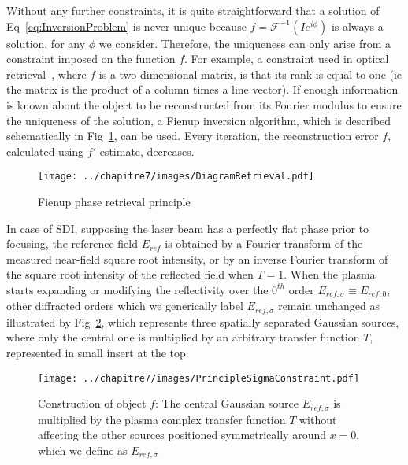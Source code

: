Without any further constraints, it is quite straightforward that a solution of Eq~\ref{eq:InversionProblem} is never unique because $f =\mathscr{F}^{-1}(I e^{i\phi})$ is always a solution, for any $\phi$ we consider. Therefore, the uniqueness can only arise from a constraint imposed on the function $f$. For example, a constraint used in optical retrieval~\cite{trebino2000frog,kane1993single,Kane2008}, where $f$ is a two-dimensional matrix, is that its rank is equal to one (ie the matrix is the product of a column times a line vector). If enough information is known about the object to be reconstructed from its Fourier modulus to ensure the uniqueness of the solution, a Fienup \cite{Fienup1987} inversion algorithm, which is described schematically in Fig~\ref{fig:DiagramRetrieval}, can be used. Every iteration, the reconstruction error $f$, calculated using $f'$ estimate, decreases.\\

\begin{figure}[H]
\centering
\texttt{[image: ../chapitre7/images/DiagramRetrieval.pdf]}\\
\caption{\label{fig:DiagramRetrieval} Fienup phase retrieval principle}
\end{figure}


 
\noindent   In case of SDI, supposing the laser beam has a perfectly flat phase prior to focusing, the reference field $E_{ref}$ is obtained by a Fourier transform of the measured near-field square root intensity, or by an inverse Fourier transform of the square root intensity of the reflected field when $T = 1$.
When the plasma starts expanding or modifying the reflectivity over the $0^{th}$ order $E_{ref,\sigma}\equiv E_{ref,0}$, other diffracted orders which we generically label $E_{ref,\bar{\sigma}}$
remain unchanged as illustrated by Fig~\ref{fig:PrincipleSigmaConstraint}, which represents three spatially separated Gaussian sources, where only the central one is multiplied by an arbitrary transfer function $T$, represented in small insert at the top.

 \begin{figure}[H]
\centering
\texttt{[image: ../chapitre7/images/PrincipleSigmaConstraint.pdf]}\\
\caption{\label{fig:PrincipleSigmaConstraint}Construction of object $f$: The central Gaussian source $E_{ref,\sigma}$ is multiplied by the plasma complex transfer function $T$ without affecting the other sources positioned symmetrically around $x=0$, which we define as $E_{ref,\bar{\sigma}}$}
\end{figure}

